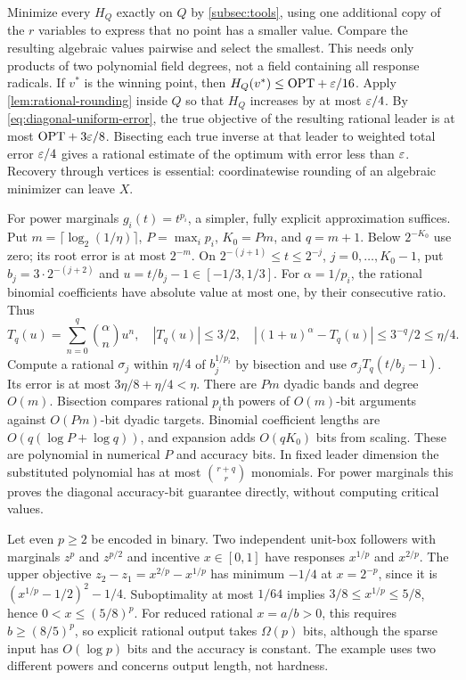 Minimize every $H_Q$ exactly on $Q$ by \cref{subsec:tools}, using
one additional copy of the $r$ variables to express that no point has a
smaller value. Compare the resulting algebraic values pairwise and
select the smallest. This needs only products of two polynomial field
degrees, not a field containing all response radicals. If $v^*$
is the winning point, then $H_Q(v^*)\le\mathrm{OPT}+\varepsilon/16$.
Apply \cref{lem:rational-rounding} inside $Q$ so that $H_Q$
increases by at most $\varepsilon/4$. By \eqref{eq:diagonal-uniform-error},
the true objective of the resulting rational leader is at most
$\mathrm{OPT}+3\varepsilon/8$. Bisecting each true inverse at that leader to
weighted total error $\varepsilon/4$ gives a rational estimate of the optimum
with error less than $\varepsilon$. Recovery through vertices is essential:
coordinatewise rounding of an algebraic minimizer can leave $X$.

For power marginals $g_i(t)=t^{p_i}$, a simpler, fully explicit
approximation suffices. Put $m=\lceil\log_2(1/\eta)\rceil$,
$P=\max_i p_i$, $K_0=Pm$, and $q=m+1$. Below $2^{-K_0}$ use zero;
its root error is at most $2^{-m}$. On
$2^{-(j+1)}\le t\le2^{-j}$, $j=0,\ldots,K_0-1$, put
$b_j=3\cdot2^{-(j+2)}$ and $u=t/b_j-1\in[-1/3,1/3]$.
For $\alpha=1/p_i$, the rational binomial coefficients have absolute
value at most one, by their consecutive ratio. Thus
\[
 T_q(u)=\sum_{n=0}^q\binom\alpha n u^n,\quad
 |T_q(u)|\le3/2,\quad
 |(1+u)^\alpha-T_q(u)|\le3^{-q}/2\le\eta/4.
\]
Compute a rational $\sigma_j$ within $\eta/4$ of $b_j^{1/p_i}$ by
bisection and use $\sigma_jT_q(t/b_j-1)$. Its error is at most
$3\eta/8+\eta/4<\eta$. There are $Pm$ dyadic bands and degree
$O(m)$. Bisection compares rational $p_i$th powers of
$O(m)$-bit arguments against $O(Pm)$-bit dyadic targets. Binomial
coefficient lengths are $O(q(\log P+\log q))$, and expansion adds
$O(qK_0)$ bits from scaling. These are polynomial in numerical $P$
and accuracy bits. In fixed leader dimension the substituted polynomial
has at most $\binom{r+q}{r}$ monomials. For power marginals this proves
the diagonal accuracy-bit guarantee directly, without computing critical
values.

\begin{example}
\label{ex:sparse-power-output}
Let even $p\ge2$ be encoded in binary. Two independent unit-box
followers with marginals $z^{p}$ and $z^{p/2}$ and incentive $x\in[0,1]$
have responses $x^{1/p}$ and $x^{2/p}$. The upper objective
$z_2-z_1=x^{2/p}-x^{1/p}$ has minimum $-1/4$ at $x=2^{-p}$,
since it is $(x^{1/p}-1/2)^2-1/4$.
Suboptimality at most $1/64$ implies
$3/8\le x^{1/p}\le5/8$, hence $0<x\le(5/8)^p$.
For reduced rational $x=a/b>0$, this requires $b\ge(8/5)^p$,
so explicit rational output takes $\Omega(p)$ bits, although the
sparse input has $O(\log p)$ bits and the accuracy is constant. The
example uses two different powers and concerns output length, not
hardness.
\end{example}

